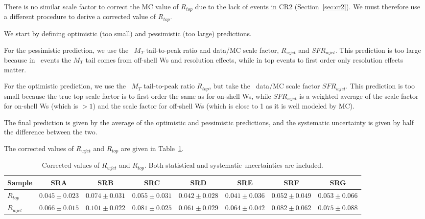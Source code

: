 
There is no similar scale factor to correct the MC value of $R_{top}$ due to the lack of events in CR2 (Section~\ref{sec:cr2}).
We must therefore use a different procedure to derive a corrected value of $R_{top}$.

We start by defining optimistic (too small) and pessimistic (too large) predictions. 

For the pessimistic prediction, we use the \wjets\ $M_T$ tail-to-peak ratio and data/MC scale factor, $R_{wjet}$ and $SFR_{wjet}$.
This prediction is too large because in \wjets\ events the $M_T$ tail comes from
off-shell Ws and resolution effects, while in top events to first order
only resolution effects matter.

For the optimistic prediction, we use the \ttsl\ $M_T$ tail-to-peak ratio $R_{top}$, but take the \wjets\ data/MC scale factor $SFR_{wjet}$.
This prediction is too small because
the true top scale factor is to first order the same as for on-shell Ws, 
while $SFR_{wjet}$ is a weighted average of the
scale factor for on-shell Ws (which is $>1$) and the
scale factor for off-shell Ws (which is close to 1 as it is well modeled by MC). 

The final prediction is given by the average of the optimistic and pessimistic predictions, and
the systematic uncertainty is given by half the difference between the two.

The corrected values of $R_{wjet}$ and $R_{top}$ are given in Table~\ref{tab:ttpcorr}.

\begin{table}[!h]
\begin{center}
{\footnotesize
\begin{tabular}{l||c|c|c|c|c|c|c}
\hline
Sample              & SRA & SRB & SRC & SRD & SRE & SRF & SRG\\
\hline
\hline
$R_{top}$ 	  & $0.045 \pm 0.023$  & $0.074 \pm 0.031$  & $0.055 \pm 0.031$  & $0.042 \pm 0.028$  & $0.041 \pm 0.036$  & $0.052 \pm 0.049$  & $0.053 \pm 0.066$  \\
$R_{wjet}$ 	  & $0.066 \pm 0.015$  & $0.101 \pm 0.022$  & $0.081 \pm 0.025$  & $0.061 \pm 0.029$  & $0.064 \pm 0.042$  & $0.082 \pm 0.062$  & $0.075 \pm 0.088$  \\
\hline
\end{tabular}}
\caption{  Corrected values of $R_{wjet}$ and $R_{top}$. Both statistical and systematic uncertainties are included.
\label{tab:ttpcorr}}
\end{center}
\end{table}

\clearpage